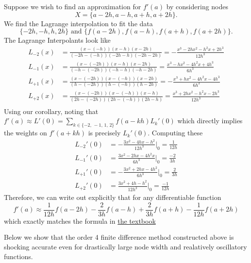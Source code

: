 \documentclass[11pt]{article}
\begin{document}
\begin{example}
    Suppose we wish to find an approximation for $f'(a)$ by considering nodes $$X = \{a-2h, a-h, a+h, a+2h\}.$$
    We find the Lagrange interpolation to fit the data $$\{-2h, -h, h, 2h\}\text{ and }\{f(a-2h), f(a-h), f(a+h), f(a+2h)\}.$$
    The Lagrange Interpolants look like \begin{align*}
        L_{-2}(x) &= \frac{(x-(-h))(x-h)(x-2h)}{(-2h-(-h))(-2h-h)(-2h-2h)} = -\frac{x^3-2hx^2-h^2x+2h^3}{12h^3}\\
          L_{-1}(x) &= \frac{(x-(-2h))(x-h)(x-2h)}{(-h-(-2h))(-h-h)(-h-2h)} = \frac{x^3-hx^2-4h^2x+4h^3}{6h^3}\\
            L_{+1}(x) &= \frac{(x-(-2h))(x-(-h))(x-2h)}{(h-(-2h))(h-(-h))(h-2h)} = -\frac{x^3+hx^2-4h^2x-4h^3}{6h^3}\\
              L_{+2}(x) &= \frac{(x-(-2h))(x-(-h))(x-h)}{(2h-(-2h))(2h-(-h))(2h-h)} = \frac{x^3+2hx^2-h^2x-2h^3}{12h^3}\\
    \end{align*}
    Using our corollary, noting that $f'(a) \approx L'(0) = \sum_{k \in \{-2, \, -1,\, 1,\, 2\}} f(a-kh)L_k'(0)$ which directly implies the weights on $f'(a+kh)$ is precisely $L_k'(0)$. Computing these \begin{align*}
        L_{-2}'(0) &= -\frac{3x^2-4hx-h^2}{12h^3}\bigg|_0 = \frac{1}{12h}\\
        L_{-1}'(0) &= \frac{3x^2-2hx-4h^2x}{6h^3}\bigg|_0 = \frac{-2}{3h}\\
        L_{+1}'(0) &= -\frac{3x^2+2hx-4h^2}{6h^3}\bigg|_0 = \frac{2}{3h}\\
        L_{+2}'(0) &= \frac{3x^2+4h-h^2}{12h^3}\bigg|_0 = \frac{-1}{12h} 
    \end{align*}
    Therefore, we can write out explicitly that for any differentiable function $$f'(a) \approx \frac{1}{12h}f(a-2h) - \frac{2}{3h}f(a-h)+\frac{2}{3h}f(a+h) - \frac{1}{12h}f(a+2h)$$
    which exactly matches the formula in \href{https://fncbook.com/finitediffs/}{the textbook}
\end{example}

Below we show that the order 4 finite difference method constructed above is shocking accurate even for drastically large node width and realatively oscillatory functions. 
\end{document}
